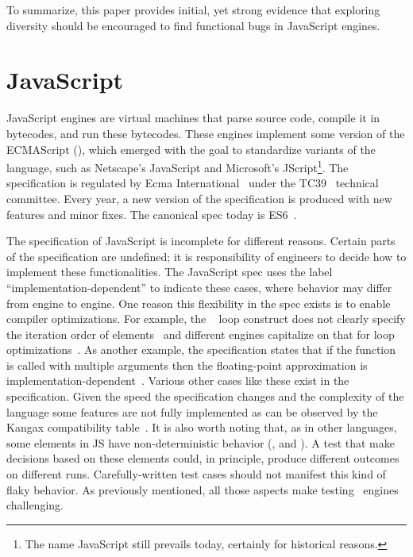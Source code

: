 \documentclass[smallextended]{svjour3}
\begin{document}
\vspace{1ex} To summarize, this paper provides initial, yet strong evidence
that exploring diversity should be encouraged to find functional bugs
in JavaScript engines.

\section{JavaScript}
\label{sec:es6-design}
\label{sec:imp-dep-behavior}

JavaScript engines are virtual machines that parse source code,
compile it in bytecodes, and run these bytecodes. These engines
implement some version of the ECMAScript (\es{}), which emerged with
the goal to standardize variants of the language, such as Netscape's
JavaScript and Microsoft's JScript\footnote{The name JavaScript still
  prevails today, certainly for historical reasons.}. The \es{}
specification is regulated by Ecma International~\cite{es6-website}
under the TC39~\cite{tc39-github} technical committee.  Every year, a
new version of the \es{} specification is produced with new features
and minor fixes. The canonical spec today is
ES6~\cite{ecmas262-spec-repo,ecmas262-spec}.


The specification of JavaScript is incomplete for different
reasons. Certain parts of the specification are undefined; it is
responsibility of engineers to decide how to implement these
functionalities. The JavaScript spec uses the label
``implementation-dependent'' to indicate these cases, where behavior
may differ from engine to engine. One reason this flexibility in the
spec exists is to enable compiler optimizations. For example, the
\js\  loop construct does not clearly specify the
iteration order of
elements~\cite{so-forin-undefined,javascript-in-chrome} and different
engines capitalize on that for loop
optimizations~\cite{for-in-undefined}.  As another example, the
specification states that if the 
function is called with multiple arguments then the floating-point
approximation is
implementation-dependent~\cite{es6-toPrecision}. Various other cases
like these exist in the specification. Given the speed the
specification changes and the complexity of the language some features
are not fully implemented as can be observed by the Kangax
compatibility table~\cite{kangax}.  It is also worth noting that, as
in other languages, some elements in JS have non-deterministic
behavior (\eg{},  and ). A test
that make decisions based on these elements could, in principle,
produce different outcomes on different runs. Carefully-written test
cases should not manifest this kind of flaky behavior.  As previously
mentioned, all those aspects make testing \js\ engines challenging.
\end{document}
